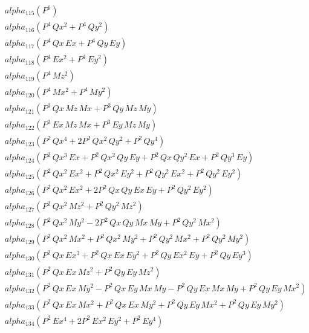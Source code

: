 \documentclass{article}
\begin{document}
\begin{align*}
  &\quad alpha_{115} \left(P^{6}\right) \\
  &\quad alpha_{116} \left(P^{4}\,Qx^{2} + P^{4}\,Qy^{2}\right) \\
  &\quad alpha_{117} \left(P^{4}\,Qx\,Ex + P^{4}\,Qy\,Ey\right) \\
  &\quad alpha_{118} \left(P^{4}\,Ex^{2} + P^{4}\,Ey^{2}\right) \\
  &\quad alpha_{119} \left(P^{4}\,Mz^{2}\right) \\
  &\quad alpha_{120} \left(P^{4}\,Mx^{2} + P^{4}\,My^{2}\right) \\
  &\quad alpha_{121} \left(P^{3}\,Qx\,Mz\,Mx + P^{3}\,Qy\,Mz\,My\right) \\
  &\quad alpha_{122} \left(P^{3}\,Ex\,Mz\,Mx + P^{3}\,Ey\,Mz\,My\right) \\
  &\quad alpha_{123} \left(P^{2}\,Qx^{4} + 2P^{2}\,Qx^{2}\,Qy^{2} + P^{2}\,Qy^{4}\right) \\
  &\quad alpha_{124} \left(P^{2}\,Qx^{3}\,Ex + P^{2}\,Qx^{2}\,Qy\,Ey + P^{2}\,Qx\,Qy^{2}\,Ex + P^{2}\,Qy^{3}\,Ey\right) \\
  &\quad alpha_{125} \left(P^{2}\,Qx^{2}\,Ex^{2} + P^{2}\,Qx^{2}\,Ey^{2} + P^{2}\,Qy^{2}\,Ex^{2} + P^{2}\,Qy^{2}\,Ey^{2}\right) \\
  &\quad alpha_{126} \left(P^{2}\,Qx^{2}\,Ex^{2} + 2P^{2}\,Qx\,Qy\,Ex\,Ey + P^{2}\,Qy^{2}\,Ey^{2}\right) \\
  &\quad alpha_{127} \left(P^{2}\,Qx^{2}\,Mz^{2} + P^{2}\,Qy^{2}\,Mz^{2}\right) \\
  &\quad alpha_{128} \left(P^{2}\,Qx^{2}\,My^{2} - 2P^{2}\,Qx\,Qy\,Mx\,My + P^{2}\,Qy^{2}\,Mx^{2}\right) \\
  &\quad alpha_{129} \left(P^{2}\,Qx^{2}\,Mx^{2} + P^{2}\,Qx^{2}\,My^{2} + P^{2}\,Qy^{2}\,Mx^{2} + P^{2}\,Qy^{2}\,My^{2}\right) \\
  &\quad alpha_{130} \left(P^{2}\,Qx\,Ex^{3} + P^{2}\,Qx\,Ex\,Ey^{2} + P^{2}\,Qy\,Ex^{2}\,Ey + P^{2}\,Qy\,Ey^{3}\right) \\
  &\quad alpha_{131} \left(P^{2}\,Qx\,Ex\,Mz^{2} + P^{2}\,Qy\,Ey\,Mz^{2}\right) \\
  &\quad alpha_{132} \left(P^{2}\,Qx\,Ex\,My^{2} -P^{2}\,Qx\,Ey\,Mx\,My -P^{2}\,Qy\,Ex\,Mx\,My + P^{2}\,Qy\,Ey\,Mx^{2}\right) \\
  &\quad alpha_{133} \left(P^{2}\,Qx\,Ex\,Mx^{2} + P^{2}\,Qx\,Ex\,My^{2} + P^{2}\,Qy\,Ey\,Mx^{2} + P^{2}\,Qy\,Ey\,My^{2}\right) \\
  &\quad alpha_{134} \left(P^{2}\,Ex^{4} + 2P^{2}\,Ex^{2}\,Ey^{2} + P^{2}\,Ey^{4}\right) \\

\end{align*}
\end{document}
